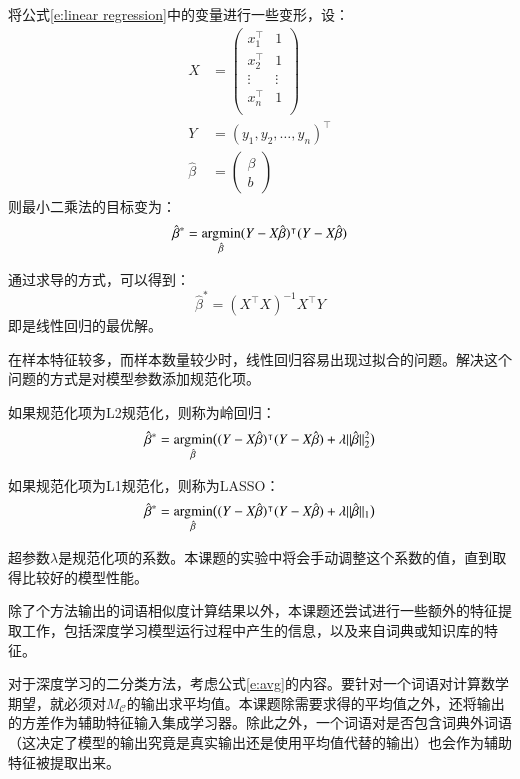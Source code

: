 将公式\ref{e:linear regression}中的变量进行一些变形，设：
\begin{align}
	X &=
	\begin{pmatrix}
		x^\intercal_1 & 1 \\
		x^\intercal_2 & 1 \\
		\vdots & \vdots \\
		x^\intercal_n & 1 \\
	\end{pmatrix} \\
	Y &= (y_1, y_2, \dots, y_n)^\intercal\\
	\hat{\beta} &=
	\begin{pmatrix}
		\beta \\
		b
	\end{pmatrix}
\end{align}
则最小二乘法的目标变为：
\begin{equation}
\hat{\beta}^* = \operatorname*{argmin}_{\hat{\beta}} (Y - X \hat{\beta})^\intercal (Y - X \hat{\beta})
\end{equation}

通过求导的方式，可以得到：
\begin{equation}
\hat{\beta}^* = (X^\intercal X)^{-1} X^\intercal Y
\end{equation}
即是线性回归的最优解。

在样本特征较多，而样本数量较少时，线性回归容易出现过拟合的问题。解决这个问题的方式是对模型参数添加规范化项。

如果规范化项为L2规范化，则称为岭回归：
\begin{equation}
\hat{\beta}^* = \operatorname*{argmin}_{\hat{\beta}} \bigl((Y - X \hat{\beta})^\intercal (Y - X \hat{\beta}) + \lambda ||\hat{\beta}||^2_2\bigr)
\end{equation}

如果规范化项为L1规范化，则称为LASSO：
\begin{equation}
\hat{\beta}^* = \operatorname*{argmin}_{\hat{\beta}} \bigl((Y - X \hat{\beta})^\intercal (Y - X \hat{\beta}) + \lambda ||\hat{\beta}||_1\bigr)
\end{equation}

超参数$\lambda$是规范化项的系数。本课题的实验中将会手动调整这个系数的值，直到取得比较好的模型性能。

\label{s:ensemble features}
除了个方法输出的词语相似度计算结果以外，本课题还尝试进行一些额外的特征提取工作，包括深度学习模型运行过程中产生的信息，以及来自词典或知识库的特征。

对于深度学习的二分类方法，考虑公式\ref{e:avg}的内容。要针对一个词语对计算数学期望，就必须对$M_\mathcal{C}$的输出求平均值。本课题除需要求得的平均值之外，还将输出的方差作为辅助特征输入集成学习器。除此之外，一个词语对是否包含词典外词语（这决定了模型的输出究竟是真实输出还是使用平均值代替的输出）也会作为辅助特征被提取出来。

